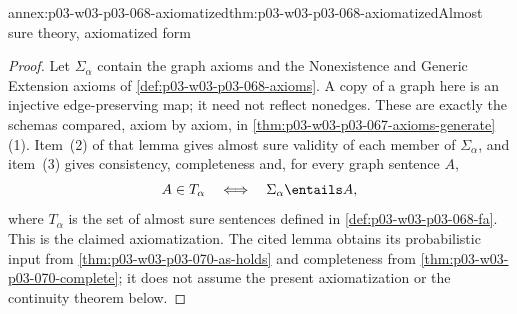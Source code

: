 \begin{annexitem}{annex:p03-w03-p03-068-axiomatized}{thm:p03-w03-p03-068-axiomatized}{Almost sure theory, axiomatized form}
\begin{proof}
Let \(\Sigma_\alpha\) contain the graph axioms and the Nonexistence and
Generic Extension axioms of \cref{def:p03-w03-p03-068-axioms}.  A copy of
a graph here is an injective edge-preserving map; it need not reflect
nonedges.  These are exactly the schemas compared, axiom by axiom, in
\cref{thm:p03-w03-p03-067-axioms-generate}(1).  Item~(2) of that lemma
gives almost sure validity of each member of \(\Sigma_\alpha\), and
item~(3) gives consistency, completeness and, for every graph sentence
\(A\),
\[
 A\in T_\alpha\quad\Longleftrightarrow\quad\Sigma_\alpha\entails A,
\]
where \(T_\alpha\) is the set of almost sure sentences defined in
\cref{def:p03-w03-p03-068-fa}.  This is the claimed axiomatization.
The cited lemma obtains its probabilistic input from
\cref{thm:p03-w03-p03-070-as-holds} and completeness from
\cref{thm:p03-w03-p03-070-complete}; it does not assume the present
axiomatization or the continuity theorem below.
\end{proof}
\end{annexitem}

